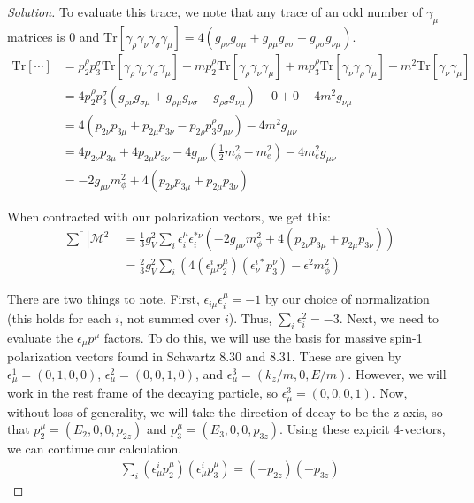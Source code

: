 \documentclass[12pt]{article}
\newenvironment{solution}{\begin{proof}[Solution]}{\end{proof}}
\begin{document}
\begin{solution}
To evaluate this trace, we note that any trace of an odd number of $\gamma_\mu$ matrices is $0$ and $\text{Tr}[\gamma_\rho \gamma_\nu \gamma_\sigma \gamma_\mu]=4(g_{\rho\nu} g_{\sigma \mu} + g_{\rho\mu} g_{\nu\sigma} - g_{\rho\sigma} g_{\nu\mu})$.
\begin{align*}
    \text{Tr}[\cdots]&=p_2^\rho p_3^\sigma \text{Tr}[\gamma_\rho \gamma_\nu \gamma_\sigma \gamma_\mu] - mp_2^\rho \text{Tr}[\gamma_\rho \gamma_\nu \gamma_\mu] + mp_3^\rho \text{Tr}[\gamma_\nu \gamma_\rho \gamma_\mu] -m^2 \text{Tr}[\gamma_\nu \gamma_\mu] \\
    &= 4 p_2^\rho p_3^\sigma(g_{\rho\nu} g_{\sigma \mu} + g_{\rho\mu} g_{\nu\sigma} - g_{\rho\sigma} g_{\nu\mu})-0+0-4m^2 g_{\nu\mu} \\
    &= 4(p_{2\nu} p_{3\mu} + p_{2\mu} p_{3\nu}-p_{2\rho}p_3^\rho g_{\mu\nu})-4m^2g_{\mu\nu} \\
    &= 4p_{2\nu} p_{3\mu} + 4p_{2\mu} p_{3\nu} - 4g_{\mu\nu}(\frac{1}{2}m_\phi^2 -m_e^2)-4m_e^2g_{\mu\nu} \\
    &= -2 g_{\mu\nu}m_\phi^2+4(p_{2\nu} p_{3\mu} + p_{2\mu} p_{3\nu})
\end{align*}

When contracted with our polarization vectors, we get this:
\begin{align*}
    \overline{\sum}|\mathcal{M}^2|&=\frac{1}{3}g_V^2 \sum_i\epsilon_i^\mu \epsilon_i^{*\nu} (-2g_{\mu\nu}m_\phi^2+4(p_{2\nu} p_{3\mu} + p_{2\mu} p_{3\nu})) \\
    &= \frac{2}{3}g_V^2\sum_i(4(\epsilon^i_\mu p_2^\mu)(\epsilon^{i*}_\nu p_3^\nu)-\epsilon^2 m_\phi^2)
\end{align*}

There are two things to note. First, $\epsilon_{i\mu}\epsilon_i^\mu=-1$ by our choice of normalization (this holds for each $i$, not summed over $i$). Thus, $\sum_i \epsilon_i^2=-3$. Next, we need to evaluate the $\epsilon_\mu p^\mu$ factors. To do this, we will use the basis for massive spin-1 polarization vectors found in Schwartz 8.30 and 8.31. These are given by $\epsilon_\mu^1=(0,1,0,0)$, $\epsilon_\mu^2=(0,0,1,0)$, and $\epsilon_\mu^3=(k_z/m,0,E/m)$. However, we will work in the rest frame of the decaying particle, so $\epsilon_\mu^3=(0,0,0,1)$. Now, without loss of generality, we will take the direction of decay to be the z-axis, so that $p_2^\mu=(E_2,0,0,p_{2z})$ and $p_3^\mu=(E_3,0,0,p_{3z})$. Using these expicit 4-vectors, we can continue our calculation.
\begin{align*}
    \sum_i(\epsilon_\mu^ip_2^\mu)(\epsilon_\mu^ip_3^\mu)=(-p_{2z})(-p_{3z})
\end{align*}


\end{solution}
\end{document}
